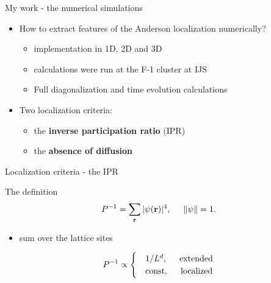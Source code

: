\documentclass[1pt]{beamer}
\newcommand{\norm}[1]{\left\Vert #1 \right\Vert}
\begin{document}
\begin{frame}{My work - the numerical simulations}
\begin{itemize}
\item How to extract features of the Anderson localization numerically?\vspace{5mm}
 \begin{itemize}
	\item implementation in 1D, 2D and 3D \vspace{2mm}
	\item calculations were run at the F-1 cluster at IJS \vspace{2mm}
	\item Full diagonalization and time evolution calculations
\end{itemize}\vspace{5mm}
\item Two localization criteria: \vspace{5mm}
\begin{itemize}
	\item the \textbf{inverse participation ratio} (IPR)\vspace{2mm}
	\item the \textbf{absence of diffusion}
\end{itemize}
\end{itemize}
\end{frame}

\begin{frame}{Localization criteria - the IPR}
\begin{alertblock}{The definition}
\begin{equation*}
P^{-1}=\sum\limits_\mathbf{r} |\psi(\textbf{r})|^4, \hspace{5mm} \norm{\psi}=1.
\end{equation*}
\end{alertblock}{}\vspace{5mm}
\begin{itemize}
	\item sum over the lattice sites
	\end{itemize}\vspace{5mm}
\begin{alertblock}{}
$$
P^{-1} \propto\begin{cases}
&1/L^d, \hspace{5mm} \text{extended} \\
&\text{const}, \hspace{5mm} \text{localized} 
\end{cases}
$$ 
\end{alertblock}{}
\end{frame}
\end{document}
